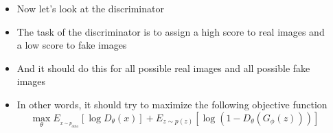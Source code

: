 \begin{frame}
	\begin{columns}
		\begin{overlayarea}{\textwidth}{\textheight}
			\vspace*{10mm}
			\begin{center}
						
			\end{center}		
		\end{overlayarea}

		\begin{overlayarea}{\textwidth}{\textheight}
			\begin{itemize}[<+->]
				\item Now let's look at the discriminator
				\item The task of the discriminator is to assign a high score to real images and a low score to fake images
				\item And it should do this for all possible real images and all possible fake images
				\item In other words, it should try to maximize the following objective function
				$$ \max_{\theta} E_{_{x \sim p_{data}}} [\log D_{\theta}(x)] + E_{z \sim p(z)} [\log (1 - D_{\theta}(G_{\phi}(z)))]$$
			\end{itemize}
		\end{overlayarea}
	\end{columns}
\end{frame}

